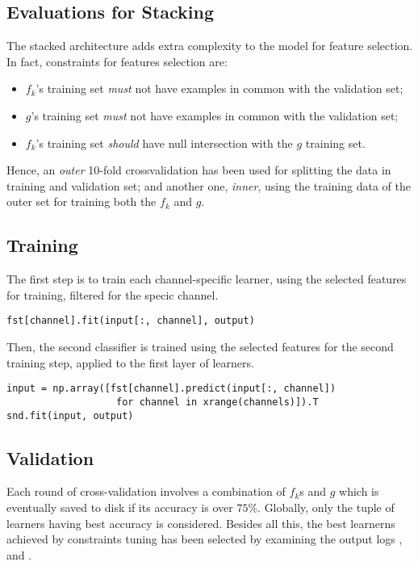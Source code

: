 \documentclass[10pt]{article}
\begin{document}
\subsection{Evaluations for Stacking}

The stacked architecture adds extra complexity to the model for feature selection. In fact, constraints for features selection are: 
\begin{itemize}
\item $f_k$'s training set \emph{must} not have examples in common with the validation set;
\item $g$'s training set \emph{must} not have examples in common with the validation set;
\item $f_k$'s training set \emph{should} have null intersection with the $g$ training set.
\end{itemize}

Hence, an \emph{outer} 10-fold crossvalidation has been used for splitting the data in training and validation set; and another one, \emph{inner}, using the training data of the outer set for training both the $f_k$ and $g$. 

\subsection{Training}

The first step is to train each channel-specific learner, using the selected features for training, filtered for the specic channel. 
\begin{verbatim}
fst[channel].fit(input[:, channel], output)
\end{verbatim}

\noindent
Then, the second classifier is trained using the selected features for the second training step, applied to the first layer of learners.
\begin{verbatim}
input = np.array([fst[channel].predict(input[:, channel])
                   for channel in xrange(channels)]).T
snd.fit(input, output)

\end{verbatim}


\subsection{Validation}
Each round of cross-validation involves a combination of $f_k$s and $g$ which is eventually saved to disk if its accuracy is over $75\%$. 
Globally, only the tuple of learners having best accuracy is considered.
Besides all this, the best learnerns achieved by constraints tuning has been selected by examining the output logs , and .
\end{document}
